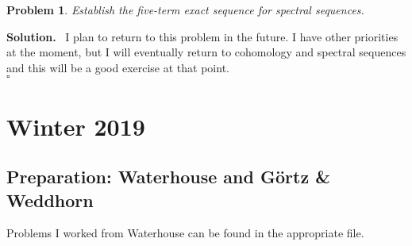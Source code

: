 \documentclass[12pt]{article}
\newtheorem{pro}[lem]{Problem}
\newenvironment{prob}{\par\smallskip
	\noindent\begin{mdframed}\small \begin{pro}}{\end{pro}\end{mdframed}\medskip}
\newenvironment{sol}{\noindent \textbf{Solution.} \,}{\\\hspace*{\fill}$\square$\medskip}
\begin{document}
\begin{prob}
	Establish the five-term exact sequence for spectral sequences.
\end{prob}
\begin{sol}
	I plan to return to this problem in the future. I have other priorities at the moment,
	but I will eventually return to cohomology and spectral sequences and this will be a good
	exercise at that point.
\end{sol}

\section{Winter 2019}
\subsection{Preparation: Waterhouse and G\"ortz \& Weddhorn}
Problems I worked from Waterhouse can be found in the appropriate file. 
\end{document}
